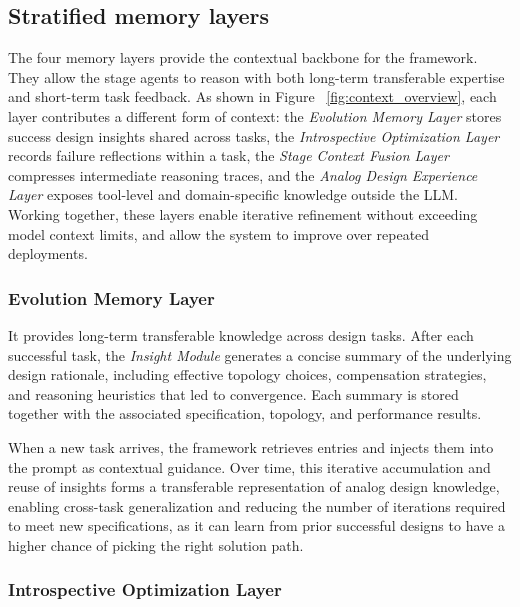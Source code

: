 \subsection{Stratified memory layers}

The four memory layers provide the contextual backbone for the framework. They allow the stage agents to reason with both long-term transferable expertise and short-term task feedback. As shown in Figure ~\ref{fig:context_overview}, each layer contributes a different form of context: the \emph{Evolution Memory Layer} stores success design insights shared across tasks, the \emph{Introspective Optimization Layer} records failure reflections within a task, the \emph{Stage Context Fusion Layer} compresses intermediate reasoning traces, and the \emph{Analog Design Experience Layer} exposes tool-level and domain-specific knowledge outside the LLM. Working together, these layers enable iterative refinement without exceeding model context limits, and allow the system to improve over repeated deployments.

\subsubsection{Evolution Memory Layer}

It provides long-term transferable knowledge across design tasks. After each successful task, the \emph{Insight Module} generates a concise summary of the underlying design rationale, including effective topology choices, compensation strategies, and reasoning heuristics that led to convergence. Each summary is stored together with the associated specification, topology, and performance results.

When a new task arrives, the framework retrieves entries and injects them into the prompt as contextual guidance. Over time, this iterative accumulation and reuse of insights forms a transferable representation of analog design knowledge, enabling cross-task generalization and reducing the number of iterations required to meet new specifications, as it can learn from prior successful designs to have a higher chance of picking the right solution path.





\subsubsection{Introspective Optimization Layer}



